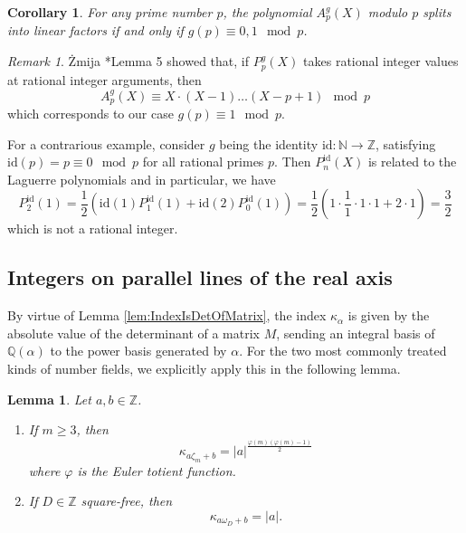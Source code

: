 \documentclass[a4paper, 11pt, reqno]{amsart}
\theoremstyle{plain}
\newtheorem{lemma}[thm]{Lemma}
\newtheorem{cor}[thm]{Corollary}
\theoremstyle{definition}
\theoremstyle{remark}
\newtheorem*{rmk}{Remark}
\numberwithin{equation}{section}
\newcommand{\Z}{\mathbb{Z}}
\newcommand{\Q}{\mathbb{Q}}
\newcommand{\N}{\mathbb{N}}
\begin{document}
\begin{cor}\label{cor:SplittingIfg(p)IsNice}
    For any prime number $p$, the polynomial $A_p^g(X)$ modulo $p$ splits into linear factors if and only if $g(p) \equiv 0,1 \mod p$.
\end{cor}

\begin{rmk}
    \.{Z}mija \cite{Zmija}*{Lemma 5} showed that, if $P_p^g(X)$ takes rational integer values at rational integer arguments, then
    \[A_p^g(X) \equiv X \cdot (X - 1) \dots (X - p + 1) \mod p\]
    which corresponds to our case $g(p) \equiv 1 \mod p$. 
    
    For a contrarious example, consider $g$ being the identity $\mathrm{id}: \N \longrightarrow \Z$, satisfying $\mathrm{id}(p) = p \equiv 0 \mod p$ for all rational primes $p$. Then $P_n^{\mathrm{id}}(X)$ is related to the Laguerre polynomials and in particular, we have
    \[P_2^{\mathrm{id}}(1) = \frac{1}{2} \left(\mathrm{id}(1) P_1^{\mathrm{id}}(1) + \mathrm{id}(2) P_0^{\mathrm{id}}(1)\right) = \frac{1}{2}\left(1 \cdot \frac{1}{1} \cdot 1 \cdot 1 + 2 \cdot 1\right) = \frac{3}{2}\]
    which is not a rational integer.
\end{rmk}

\subsection{Integers on parallel lines of the real axis}

By virtue of Lemma \ref{lem:IndexIsDetOfMatrix}, the index $\kappa_\alpha$ is given by the absolute value of the determinant of a matrix $M$, sending an integral basis of $\Q(\alpha)$ to the power basis generated by $\alpha$. For the two most commonly treated kinds of number fields, we explicitly apply this in the following lemma.

\begin{lemma}\label{lem:IndexOfaZeta_mAndaOmega_D}
    Let $a, b \in \Z$.
    \begin{enumerate}
        \item If $m \geq 3$, then
        \begin{equation*}
            \kappa_{a\zeta_m + b} = |a|^{\frac{\varphi(m)\left(\varphi(m) - 1\right)}{2}}
        \end{equation*}
        where $\varphi$ is the Euler totient function.
        \item If $D \in \Z$ square-free, then
        \begin{equation*}
            \kappa_{a\omega_D + b} = |a|. 
        \end{equation*}
    \end{enumerate}
\end{lemma}
\end{document}
